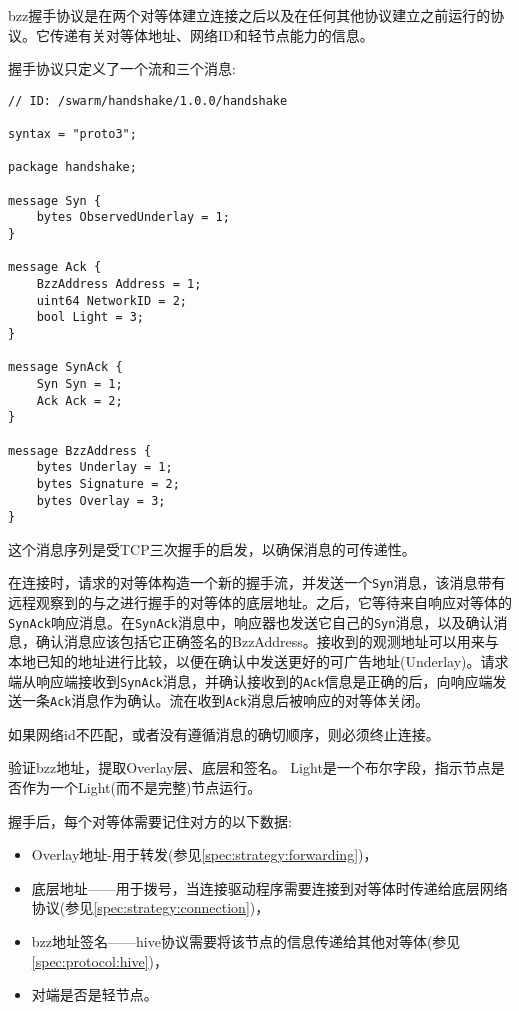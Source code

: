 

bzz握手协议是在两个对等体建立连接之后以及在任何其他协议建立之前运行的协议。它传递有关对等体地址、网络ID和轻节点能力的信息。

握手协议只定义了一个流和三个消息:

\begin{definition}\label{def:bzz-messages}

\begin{lstlisting}
// ID: /swarm/handshake/1.0.0/handshake

syntax = "proto3";

package handshake;

message Syn {
    bytes ObservedUnderlay = 1;
}

message Ack {
    BzzAddress Address = 1;
    uint64 NetworkID = 2;
    bool Light = 3;
}

message SynAck {
    Syn Syn = 1;
    Ack Ack = 2;
}

message BzzAddress {
    bytes Underlay = 1;
    bytes Signature = 2;
    bytes Overlay = 3;
}
\end{lstlisting}
\end{definition}

这个消息序列是受TCP三次握手的启发，以确保消息的可传递性。

在连接时，请求的对等体构造一个新的握手流，并发送一个\lstinline{Syn}消息，该消息带有远程观察到的与之进行握手的对等体的底层地址。之后，它等待来自响应对等体的\lstinline{SynAck}响应消息。在\lstinline{SynAck}消息中，响应器也发送它自己的\lstinline{Syn}消息，以及确认消息，确认消息应该包括它正确签名的BzzAddress。接收到的观测地址可以用来与本地已知的地址进行比较，以便在确认中发送更好的可广告地址(Underlay)。请求端从响应端接收到\lstinline{SynAck}消息，并确认接收到的\lstinline{Ack}信息是正确的后，向响应端发送一条\lstinline{Ack}消息作为确认。流在收到\lstinline{Ack}消息后被响应的对等体关闭。

如果网络id不匹配，或者没有遵循消息的确切顺序，则必须终止连接。

验证bzz地址，提取Overlay层、底层和签名。
Light是一个布尔字段，指示节点是否作为一个Light(而不是完整)节点运行。

握手后，每个对等体需要记住对方的以下数据:

\begin{itemize}
    \item Overlay地址-用于转发(参见\ref{spec:strategy:forwarding})，
    \item 底层地址——用于拨号，当连接驱动程序需要连接到对等体时传递给底层网络协议(参见\ref{spec:strategy:connection})，
    \item bzz地址签名——hive协议需要将该节点的信息传递给其他对等体(参见\ref{spec:protocol:hive})，
    \item 对端是否是轻节点。
\end{itemize}


